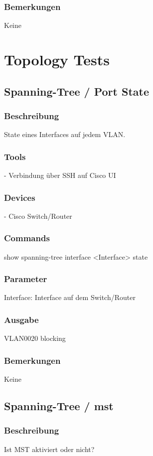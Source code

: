 \documentclass[a4,12pt]{scrartcl}
\begin{document}
\subsubsection{Bemerkungen}
Keine

\newpage
\section{Topology Tests}

\subsection{Spanning-Tree / Port State}
\subsubsection{Beschreibung}
State eines Interfaces auf jedem VLAN.
\subsubsection{Tools}
- Verbindung über SSH auf Cisco UI 
\subsubsection{Devices}
- Cisco Switch/Router
\subsubsection{Commands}
show spanning-tree interface <Interface> state
\subsubsection{Parameter}
Interface: Interface auf dem Switch/Router
\subsubsection{Ausgabe}
VLAN0020            blocking
\subsubsection{Bemerkungen}
Keine

\subsection{Spanning-Tree / mst}
\subsubsection{Beschreibung}
Ist MST aktiviert oder nicht?
\end{document}
